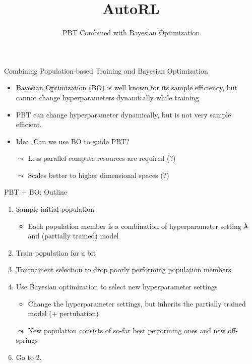\documentclass[aspectratio=169]{../latex_main/tntbeamer}  %
\title[AutoRL]{AutoRL}
\subtitle{PBT Combined with Bayesian Optimization}
\begin{document}
	
	\maketitle


\begin{frame}[c]{Combining Population-based Training and Bayesian Optimization}

\begin{itemize}
	\item Bayesian Optimization (BO) is well known for its sample efficiency, but cannot change hyperparameters dynamically while training
        \item PBT can change hyperparameter dynamically, but is not very sample efficient.
	\pause
	\medskip
	\item \alert{Idea:} Can we use BO to guide PBT? 
	\pause
	\medskip
	\item[$\leadsto$] Less parallel compute resources are required (?)
	\pause
	\medskip
	\item[$\leadsto$] Scales better to higher dimensional spaces (?)
\end{itemize}

\end{frame}
\begin{frame}[c]{PBT + BO: Outline}

\begin{enumerate}
	\item Sample initial population
	\begin{itemize}
		\item Each population member is a combination of hyperparameter setting $\pmb{\lambda}$ and (partially trained) model
	\end{itemize}
	\item Train population for a bit 
	\item Tournament selection to drop poorly performing population members
	\item Use \alert{Bayesian optimization} to select new hyperparameter settings
	\begin{itemize}
		\item Change the hyperparameter settings, but inherits the partially trained model (+ pertubation)
	\end{itemize}
	\item[$\leadsto$] New population consists of so-far best performing ones and new off-springs
	\item Go to 2.
\end{enumerate}


\end{frame}
\end{document}
